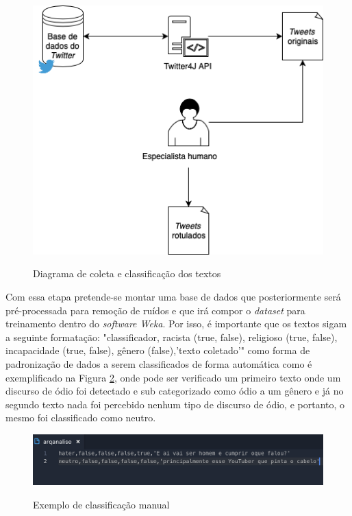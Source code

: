 \begin{figure}[!h]
\centering 
\caption{Diagrama de coleta e classificação dos textos}
\includegraphics[scale=0.50]{imagens/coletatweets.png}
\label{fig:classificacaotextos}
\end{figure}

Com essa etapa pretende-se montar uma base de dados que posteriormente será pré-processada para remoção de ruídos e que irá compor o \textit{dataset} para treinamento dentro do \textit{software Weka}. Por isso, é importante que os textos sigam a seguinte formatação: "classificador, racista (true, false), religioso (true, false), incapacidade (true, false), gênero (false),'texto coletado'" como forma de padronização de dados a serem classificados de forma automática como é exemplificado na Figura \ref{fig:arqanalise}, onde pode ser verificado um primeiro texto onde um discurso de ódio foi detectado e sub categorizado como ódio a um gênero e já no segundo texto nada foi percebido nenhum tipo de discurso de ódio, e portanto, o mesmo foi classificado como neutro.

\begin{figure}[!h]
\centering 
\caption{Exemplo de classificação manual }
\includegraphics[scale=0.60]{imagens/arqanalise.png}
\label{fig:arqanalise}
\end{figure}

